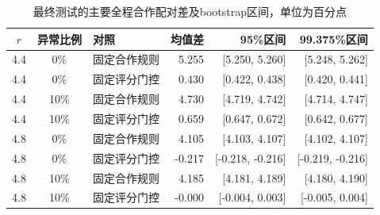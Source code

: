 \begin{table}[!htbp]
\centering\small
\caption{最终测试的主要全程合作配对差及bootstrap区间，单位为百分点}
\label{tab:w2-final-primary}
\begin{tabular}{cclrrr}
\toprule
$r$ & 异常比例 & 对照 & 均值差 & 95\%区间 & 99.375\%区间 \\
\midrule
4.4 & 0\% & 固定合作规则 & 5.255 & [5.250, 5.260] & [5.248, 5.262] \\
4.4 & 0\% & 固定评分门控 & 0.430 & [0.422, 0.438] & [0.420, 0.441] \\
4.4 & 10\% & 固定合作规则 & 4.730 & [4.719, 4.742] & [4.714, 4.747] \\
4.4 & 10\% & 固定评分门控 & 0.659 & [0.647, 0.672] & [0.642, 0.677] \\
4.8 & 0\% & 固定合作规则 & 4.105 & [4.103, 4.107] & [4.102, 4.107] \\
4.8 & 0\% & 固定评分门控 & -0.217 & [-0.218, -0.216] & [-0.219, -0.216] \\
4.8 & 10\% & 固定合作规则 & 4.185 & [4.181, 4.189] & [4.180, 4.190] \\
4.8 & 10\% & 固定评分门控 & -0.000 & [-0.004, 0.003] & [-0.005, 0.004] \\
\bottomrule
\end{tabular}
\par{}
\end{table}
